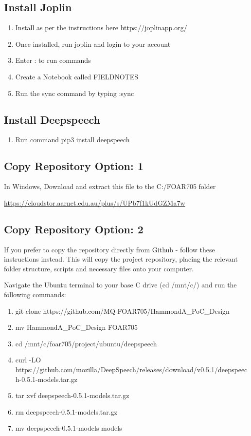 \documentclass{article}
\begin{document}
\subsection{Install Joplin}
\begin{enumerate}
    \item Install as per the instructions here https://joplinapp.org/
    \item Once installed, run joplin and login to your account
    \item Enter : to run commands
    \item Create a Notebook called FIELDNOTES
    \item Run the sync command by typing :sync
\end{enumerate}

\subsection{Install Deepspeech}
\begin{enumerate}
    \item Run command pip3 install deepspeech
\end{enumerate}


\subsection{Copy Repository Option: 1}
In Windows, Download and extract this file to the C:/FOAR705 folder

\url{https://cloudstor.aarnet.edu.au/plus/s/UPb7f1kUdGZMa7w}


\subsection{Copy Repository Option: 2}
If you prefer to copy the repository directly from Github - follow these instructions instead. This will copy the project repository, placing the relevant folder structure, scripts and necessary files onto your computer. 

Navigate the Ubuntu terminal to your base C drive (cd /mnt/c/) and run the following commands:
\begin{enumerate}
    \item git clone https://github.com/MQ-FOAR705/HammondA\_PoC\_Design
    \item mv HammondA\_PoC\_Design FOAR705
    \item cd /mnt/c/foar705/project/ubuntu/deepspeech
    \item curl -LO https://github.com/mozilla/DeepSpeech/releases/download/v0.5.1/deepspeech-0.5.1-models.tar.gz
    \item tar xvf deepspeech-0.5.1-models.tar.gz
    \item rm deepspeech-0.5.1-models.tar.gz
    \item mv deepspeech-0.5.1-models models
\end{enumerate}
\end{document}

